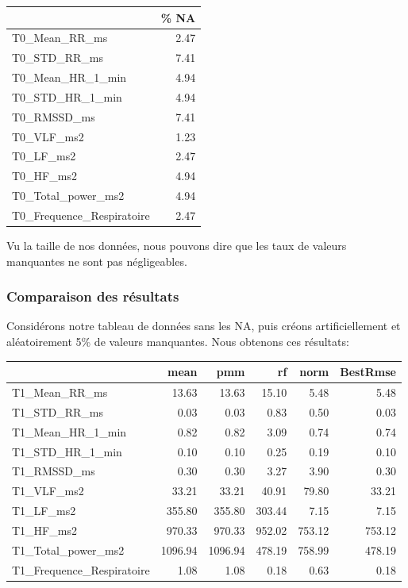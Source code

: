 \documentclass[]{article}
\begin{document}
\begin{table}[H]
\centering
\begin{tabular}{l|r}
\hline
  & \% NA\\
\hline
T0\_Mean\_RR\_ms & 2.47\\
\hline
T0\_STD\_RR\_ms & 7.41\\
\hline
T0\_Mean\_HR\_1\_min & 4.94\\
\hline
T0\_STD\_HR\_1\_min & 4.94\\
\hline
T0\_RMSSD\_ms & 7.41\\
\hline
T0\_VLF\_ms2 & 1.23\\
\hline
T0\_LF\_ms2 & 2.47\\
\hline
T0\_HF\_ms2 & 4.94\\
\hline
T0\_Total\_power\_ms2 & 4.94\\
\hline
T0\_Frequence\_Respiratoire & 2.47\\
\hline
\end{tabular}
\end{table}

Vu la taille de nos données, nous pouvons dire que les taux de valeurs
manquantes ne sont pas négligeables.

\hypertarget{comparaison-des-resultats}{%
\subsubsection{Comparaison des
résultats}\label{comparaison-des-resultats}}

Considérons notre tableau de données sans les NA, puis créons
artificiellement et aléatoirement 5\% de valeurs manquantes. Nous
obtenons ces résultats:

\begin{table}[H]
\centering
\begin{tabular}{l|r|r|r|r|r}
\hline
  & mean & pmm & rf & norm & BestRmse\\
\hline
T1\_Mean\_RR\_ms & 13.63 & 13.63 & 15.10 & 5.48 & 5.48\\
\hline
T1\_STD\_RR\_ms & 0.03 & 0.03 & 0.83 & 0.50 & 0.03\\
\hline
T1\_Mean\_HR\_1\_min & 0.82 & 0.82 & 3.09 & 0.74 & 0.74\\
\hline
T1\_STD\_HR\_1\_min & 0.10 & 0.10 & 0.25 & 0.19 & 0.10\\
\hline
T1\_RMSSD\_ms & 0.30 & 0.30 & 3.27 & 3.90 & 0.30\\
\hline
T1\_VLF\_ms2 & 33.21 & 33.21 & 40.91 & 79.80 & 33.21\\
\hline
T1\_LF\_ms2 & 355.80 & 355.80 & 303.44 & 7.15 & 7.15\\
\hline
T1\_HF\_ms2 & 970.33 & 970.33 & 952.02 & 753.12 & 753.12\\
\hline
T1\_Total\_power\_ms2 & 1096.94 & 1096.94 & 478.19 & 758.99 & 478.19\\
\hline
T1\_Frequence\_Respiratoire & 1.08 & 1.08 & 0.18 & 0.63 & 0.18\\
\hline
\end{tabular}
\end{table}
\end{document}
